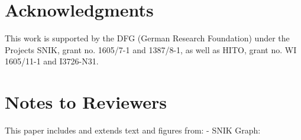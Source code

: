 \documentclass[sw]{iosart2x}
\renewcommand{\citet}{\cite}%
\begin{document}
\section{Acknowledgments}
This work is supported by the DFG (German Research Foundation) under the Projects SNIK, grant no. 1605/7-1 and 1387/8-1, as well as HITO, grant no. WI 1605/11-1 and I3726-N31.



\section{Notes to Reviewers}
This paper includes and extends text and figures from:
- SNIK Graph: 
\end{document}
